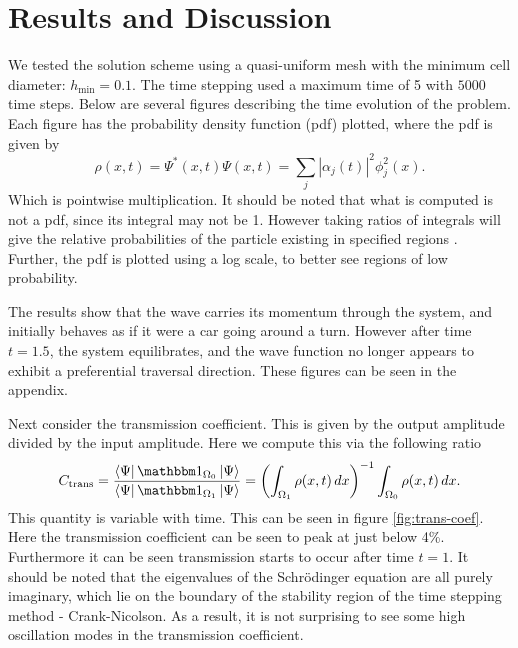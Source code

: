 \documentclass[../../main.tex]{subfiles}
\begin{document}
\section{Results and Discussion}

We tested the solution scheme using a quasi-uniform mesh
with the minimum cell diameter: $h_\mathrm{min} = 0.1$.
The time stepping used a maximum time of 5 with $5000$ time steps.  
Below are several figures describing the time evolution of the problem.
Each figure has the probability density function (pdf) plotted,
where the pdf is given by
\[
		\rho(x, t) = \Psi^*(x, t) \Psi(x, t) = 
		\sum_j |\alpha_j(t)|^2 \phi_j^2(x)
.\] 
Which is pointwise multiplication.  
It should be noted that what is computed is not a pdf, since its 
integral may not be 1.  
However taking ratios of integrals will give the relative probabilities 
of the particle existing in specified regions 
\cite{wasserman-statistics}. 
Further, the pdf is plotted using a log scale, to better see
regions of low probability.


The results show that the wave carries its momentum through the system,
and initially behaves as if it were a car going around a turn.  
However after time $t = 1.5$, the system equilibrates,
and the wave function no longer appears to exhibit a preferential 
traversal direction.  These figures can be seen in the appendix.

Next consider the transmission coefficient.  
This is given by the output amplitude divided by the input 
amplitude.  Here we compute this via the following ratio
\begin{equation}
		\label{eq:transmission}
		C_\mathrm{trans} = \frac{
		\bra{\Psi} \mathbbm 1_{\Omega_0} \ket{\Psi}}{
		\bra{\Psi} \mathbbm 1_{\Omega_1} \ket{\Psi}} = 
		\left(\int_{\Omega_1} \rho(x, t) \, dx\right)^{-1} 
		\int_{\Omega_0} \rho(x, t) \, dx
.\end{equation}
This quantity is variable with time.  
This can be seen in figure \ref{fig:trans-coef}.  
Here the transmission coefficient can be seen to peak at 
just below 4\%.  
Furthermore it can be seen transmission starts to occur after time 
$t = 1$.  
It should be noted that the eigenvalues of the Schr\"odinger equation
are all purely imaginary, which lie on the boundary 
of the stability region of the time stepping method - Crank-Nicolson.
As a result, it is not surprising to see some high oscillation modes
in the transmission coefficient.
\end{document}
